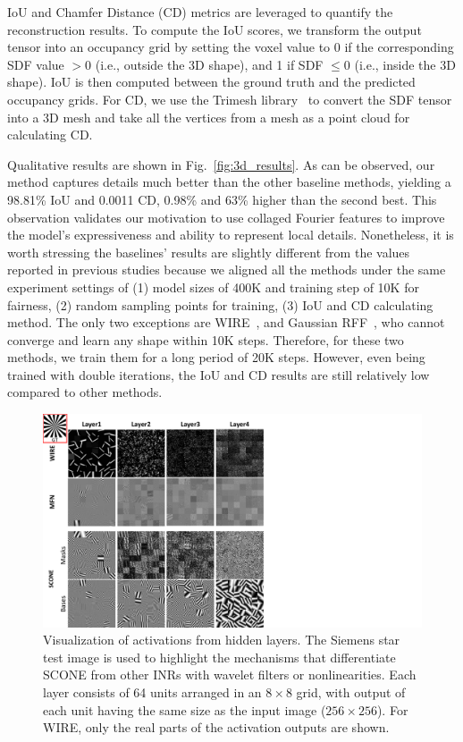 \documentclass[letterpaper]{article} %
\begin{document}
IoU and Chamfer Distance (CD) metrics are leveraged to quantify the reconstruction results. To compute the IoU scores, we transform the output tensor into an occupancy grid by setting the voxel value to 0 if the corresponding SDF value $>0$ (i.e., outside the 3D shape), and 1 if SDF $ \leqslant 0$ (i.e., inside the 3D shape). IoU is then computed between the ground truth and the predicted occupancy grids. For CD, we use the Trimesh library~\cite{trimesh} to convert the SDF tensor into a 3D mesh and take all the vertices from a mesh as a point cloud for calculating CD. 

Qualitative results are shown in Fig.~\ref{fig:3d_results}. As can be observed, our method captures details much better than the other baseline methods, yielding a 98.81\% IoU and 0.0011 CD, 0.98\% and 63\% higher than the second best. This observation validates our motivation to use collaged Fourier features to improve the model's expressiveness and ability to represent local details. Nonetheless, it is worth stressing the baselines' results are slightly different from the values reported in previous studies because we aligned all the methods under the same experiment settings of (1) model sizes of 400K and training step of 10K for fairness, (2) random sampling points for training, (3) IoU and CD calculating method. The only two exceptions are WIRE~\cite{saragadam2023wire}, and Gaussian RFF~\cite{tancik2020fourier}, who cannot converge and learn any shape within 10K steps. Therefore, for these two methods, we train them for a long period of 20K steps. However, even being trained with double iterations, the IoU and CD results are still relatively low compared to other methods.

\begin{figure}[!ht]
    \centering
    \includegraphics[width=0.95\columnwidth]{Figures/activations.pdf}  
    \caption{Visualization of activations from hidden layers. The Siemens star test image is used to highlight the mechanisms that differentiate SCONE from other INRs with wavelet filters or nonlinearities. Each layer consists of 64 units arranged in an $8\times8$ grid, with output of each unit having the same size as the input image ($256\times256$). For WIRE, only the real parts of the activation outputs are shown.}
    \label{fig:activations}
\end{figure}
\end{document}

